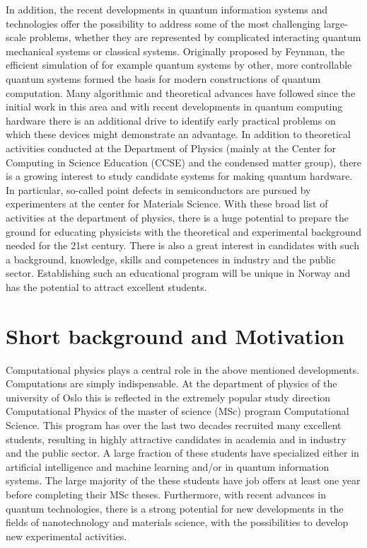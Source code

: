\documentclass[aps,rmp,preprint,amsmath,amssymb,graphicx,longbibliography]{revtex4-1}
\begin{document}
In addition, the recent developments in quantum information systems and technologies offer the possibility to address some of the most challenging large-scale problems, whether they are represented by complicated interacting quantum mechanical systems or classical systems.
Originally proposed by Feynman, the efficient
simulation of for example quantum systems by other, more controllable quantum
systems formed the basis for modern constructions of quantum
computation.  
Many algorithmic and theoretical advances have followed since the
initial work in this area and with recent developments in quantum computing
hardware there is an additional drive to identify early practical problems on
which these devices might demonstrate an advantage. In addition to theoretical activities conducted at the Department of Physics (mainly at the Center for Computing in Science Education (CCSE) and the condensed matter group), there is a growing interest to study candidate systems for making quantum hardware. In particular, so-called point defects in semiconductors are pursued by experimenters at the center for Materials Science. 
With these broad list of activities at the department of physics, there is a huge potential to prepare the ground for educating physicists with the theoretical and experimental background needed for the 21st century. There is also a great interest in candidates with such a background, knowledge, skills and competences in industry and the public sector.
Establishing such an educational program will be unique in Norway and has the potential to attract excellent students.  



\section{Short background and Motivation}

Computational physics plays a central role in the above mentioned   developments. 
Computations are simply indispensable. 
At the department of physics of the university of Oslo this is reflected in the extremely popular study direction Computational Physics of the master of science (MSc) program Computational Science. This program has over the last two decades recruited many excellent students, resulting in highly attractive candidates in academia and in industry  and the public sector. A large fraction of these students have specialized either in artificial intelligence and machine learning and/or in quantum information systems.  The large  majority of the these students have job offers at least one year before completing their MSc theses. Furthermore, with recent advances in quantum technologies, there is a strong potential for new developments in the fields of nanotechnology and materials science, with the possibilities to develop new experimental activities. 
\end{document}
